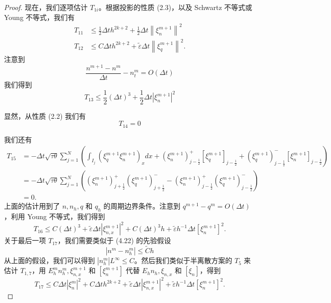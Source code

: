 \begin{proof}
    现在，我们逐项估计 $T_{1 i}$。根据投影的性质 (2.3)，以及 Schwartz 不等式或 Young 不等式，我们有
    $$
        \begin{aligned}
            T_{11} & \leq \frac{1}{2} \Delta t h^{2 k+2}+\frac{1}{2} \Delta t\left\|\xi_{n}^{m+1}\right\|^{2} \\
            T_{12} & \leq C \Delta t h^{2 k+2}+\tilde{\varepsilon} \Delta t\left\|\xi_{q}^{m+1}\right\|^{2} .
        \end{aligned}
    $$
    注意到
    $$ \frac{n^{m+1}-n^{m}}{\Delta t}-n_{t}^{m}=O(\Delta t) $$ 我们得到 $$ T_{13} \leq \frac{1}{2}(\Delta t)^{3}+\frac{1}{2} \Delta t\left|\xi_{n}^{m+1}\right|^{2}
    $$

    显然，从性质 (2.2) 我们有 $$ T_{14}=0 $$

    我们还有 $$
        \begin{aligned}
            T_{15} & =-\Delta t \sqrt{\tau \theta} \sum_{j=1}^{N}\left(\int_{I_{j}}\left(\xi_{q}^{m+1} \xi_{n}^{m+1}\right)_{x} d x+\left(\xi_{n}^{m+1}\right)_{j-\frac{1}{2}}^{+}\left[\xi_{q}^{m+1}\right]_{j-\frac{1}{2}}+\left(\xi_{q}^{m+1}\right)_{j-\frac{1}{2}}^{-}\left[\xi_{n}^{m+1}\right]_{j-\frac{1}{2}}\right) \\
                   & =-\Delta t \sqrt{\tau \theta} \sum_{j=1}^{N}\left(\left(\xi_{n}^{m+1}\right)_{j+\frac{1}{2}}^{+}\left(\xi_{q}^{m+1}\right)_{j+\frac{1}{2}}^{-}-\left(\xi_{n}^{m+1}\right)_{j-\frac{1}{2}}^{+}\left(\xi_{q}^{m+1}\right)_{j-\frac{1}{2}}^{-}\right)                                                      \\
                   & =0 .
        \end{aligned}
    $$
    上面的估计用到了 $n, n_{h}, q$ 和 $q_{h}$ 的周期边界条件。注意到 $q^{m+1}-q^{m}=O(\Delta t)$，利用 Young 不等式，我们得到
    $$ T_{16} \leq C(\Delta t)^{3}+\tilde{\varepsilon} \Delta t\left|\xi_{n, x}^{m+1}\right|^{2}+C(\Delta t)^{3} h+\tilde{\varepsilon} h^{-1} \Delta t\left[\xi_{n}^{m+1}\right]^{2} .
    $$
    关于最后一项 $T_{17}$，我们需要类似于 (4.22) 的先验假设
    $$ \left|n^{m}-n_{h}^{m}\right| \leq \tilde{C} h $$
    从上面的假设，我们可以得到 $\left|n_{h}^{m}\right|{L^{\infty}} \leq C$。然后我们类似于半离散方案的 $T_{5}$ 来估计 $T_{1,7}$，用 $E_{h}^{m} n_{h}^{m}, \xi_{n, x}^{m+1}$ 和 $\left[\xi_{n}^{m+1}\right]$ 代替 $E_{h} n_{h}, \xi_{n, x}$ 和 $\left[\xi_{n}\right]$，得到
    $$ T_{17} \leq C \Delta t\left|\xi_{n}^{m}\right|^{2}+C \Delta t h^{2 k+2}+\tilde{\varepsilon} \Delta t\left|\xi_{n, x}^{m+1}\right|^{2}+\tilde{\varepsilon} h^{-1} \Delta t\left[\xi_{n}^{m+1}\right]^{2} .
$$
\end{proof}
